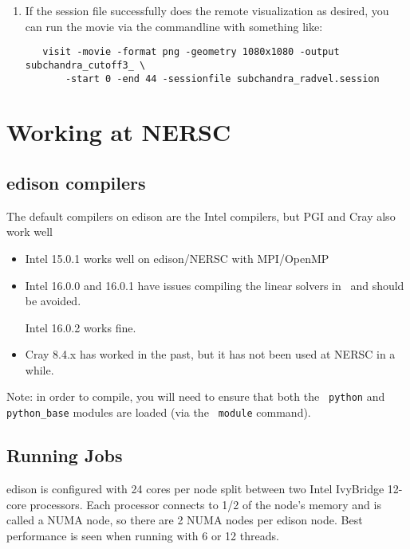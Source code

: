 \begin{itemize}
\begin{enumerate}
  \item If the session file successfully does the remote visualization
   as desired, you can run the movie via the commandline with something like:

   \begin{verbatim}
   visit -movie -format png -geometry 1080x1080 -output subchandra_cutoff3_ \
       -start 0 -end 44 -sessionfile subchandra_radvel.session
   \end{verbatim}

  \end{enumerate}

\end{itemize}


\section{Working at NERSC}

\subsection{edison compilers}

The default compilers on edison are the Intel compilers, but
PGI and Cray also work well

\begin{itemize}
\item Intel 15.0.1 works well on edison/NERSC with MPI/OpenMP

\item Intel 16.0.0 and 16.0.1 have issues compiling the linear solvers
  in \boxlib\ and should be avoided.

  Intel 16.0.2 works fine.

\item Cray 8.4.x has worked in the past, but it has not been used
  at NERSC in a while.

\end{itemize}

Note: in order to compile, you will need to ensure that both the {\tt
python} and {\tt python\_base} modules are loaded (via the {\tt
module} command).  

\subsection{Running Jobs}

edison is configured with 24 cores per node split between two Intel
IvyBridge 12-core processors.  Each processor connects to 1/2 of the
node's memory and is called a NUMA node, so there are 2 NUMA nodes per
edison node.  Best performance is seen when running with 6 or 12 threads.

